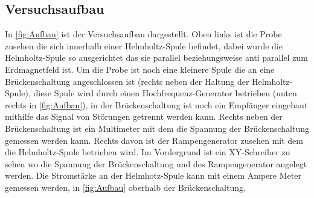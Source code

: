 \subsection{Versuchsaufbau}

In \cref{fig:Aufbau} ist der Versuchsaufbau dargestellt. Oben links ist die Probe zusehen die sich innerhalb einer Helmholtz-Spule befindet, dabei wurde die Helmholtz-Spule so ausgerichtet das sie parallel beziehungsweise anti parallel zum Erdmagnetfeld ist. Um die Probe ist noch eine kleinere Spule die an eine Brückenschaltung angeschlossen ist (rechts neben der Haltung der Helmholtz-Spule), diese Spule wird durch einen Hochfrequenz-Generator betrieben (unten rechts in \cref {fig:Aufbau}), in der Brückenschaltung ist noch ein Empfänger eingebaut mithilfe das Signal von Störungen getrennt werden kann. Rechts neben der Brückenschaltung ist ein Multimeter mit dem die Spannung der Brückenschaltung gemessen werden kann. Rechts davon ist der Rampengenerator zusehen mit dem die Helmholtz-Spule betrieben wird. Im Vordergrund ist ein XY-Schreiber zu sehen wo die Spannung der Brückenschaltung und des Rampengenerator angelegt werden. Die Stromstärke an der Helmhotz-Spule kann mit einem Ampere Meter gemessen werden, in 	\ref{fig:Aufbau} oberhalb der Brückenschaltung.
